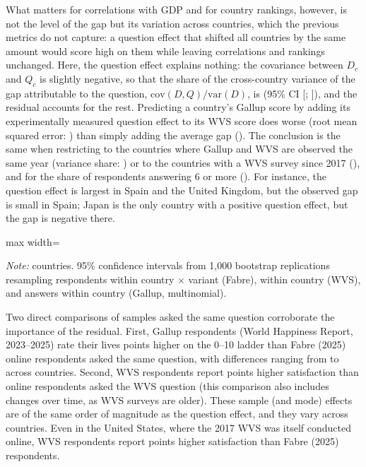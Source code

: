 What matters for correlations with GDP and for country rankings, however, is not the level of the gap but its variation across countries, which the previous metrics do not capture: a question effect that shifted all countries by the same amount would score high on them while leaving correlations and rankings unchanged. Here, the question effect explains nothing: the covariance between $D_c$ and $Q_c$ is slightly negative, so that the share of the cross-country variance of the gap attributable to the question, $\mathrm{cov}(D,Q)/\mathrm{var}(D)$, is \decompVarShareQuestion (95\% CI [\decompLowVarShareQuestion; \decompHighVarShareQuestion]), and the residual accounts for the rest. Predicting a country's Gallup score by adding its experimentally measured question effect to its WVS score does worse (root mean squared error: \decompRmsePredictionGallup) than simply adding the average gap (\decompRmseNaive). The conclusion is the same when restricting to the \nSameYear countries where Gallup and WVS are observed the same year (variance share: \varShareQuestionSameYear) or to the \nRecent countries with a WVS survey since 2017 (\varShareQuestionRecent), and for the share of respondents answering 6 or more (\decompVarShareQuestionSat). For instance, the question effect is largest in Spain and the United Kingdom, but the observed gap is small in Spain; Japan is the only country with a positive question effect, but the gap is negative there.

\begin{table}[htbp]
    \centering
    \caption{Decomposition of the Gallup--WVS gap: summary}\label{tab:decomposition_summary}
    \begin{adjustbox}{max width=\textwidth}
    
    \end{adjustbox}
    \begin{minipage}{\textwidth}\footnotesize \textit{Note:} \nDecompCountries countries. 95\% confidence intervals from 1,000 bootstrap replications resampling respondents within country $\times$ variant (Fabre), within country (WVS), and answers within country (Gallup, multinomial).\end{minipage}
\end{table}

Two direct comparisons of samples asked the same question corroborate the importance of the residual. First, Gallup respondents (World Happiness Report, 2023--2025) rate their lives \meanSampleEffectGallup points higher on the 0--10 ladder than Fabre (2025) online respondents asked the same question, with differences ranging from \minSampleEffectGallup to \maxSampleEffectGallup across countries. Second, WVS respondents report \meanSampleEffectWVS points higher satisfaction than online respondents asked the WVS question (this comparison also includes changes over time, as WVS surveys are older). These sample (and mode) effects are of the same order of magnitude as the question effect, and they vary across countries. Even in the United States, where the 2017 WVS was itself conducted online, WVS respondents report \sampleEffectUSWVS points higher satisfaction than Fabre (2025) respondents.

